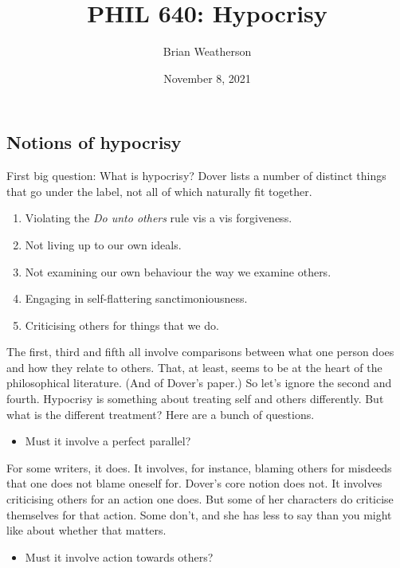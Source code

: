 \documentclass[
]{article}
\title{PHIL 640: Hypocrisy}
\author{Brian Weatherson}
\date{November 8, 2021}
\providecommand{\tightlist}{%
  \setlength{\itemsep}{0pt}\setlength{\parskip}{0pt}}
\begin{document}
\maketitle

\hypertarget{notions-of-hypocrisy}{%
\subsection{Notions of hypocrisy}\label{notions-of-hypocrisy}}

First big question: What is hypocrisy? Dover lists a number of distinct
things that go under the label, not all of which naturally fit together.

\begin{enumerate}
\def\labelenumi{\arabic{enumi}.}
\tightlist
\item
  Violating the \emph{Do unto others} rule vis a vis forgiveness.
\item
  Not living up to our own ideals.
\item
  Not examining our own behaviour the way we examine others.
\item
  Engaging in self-flattering sanctimoniousness.
\item
  Criticising others for things that we do.
\end{enumerate}

The first, third and fifth all involve comparisons between what one
person does and how they relate to others. That, at least, seems to be
at the heart of the philosophical literature. (And of Dover's paper.) So
let's ignore the second and fourth. Hypocrisy is something about
treating self and others differently. But what is the different
treatment? Here are a bunch of questions.

\begin{itemize}
\tightlist
\item
  Must it involve a perfect parallel?
\end{itemize}

For some writers, it does. It involves, for instance, blaming others for
misdeeds that one does not blame oneself for. Dover's core notion does
not. It involves criticising others for an action one does. But some of
her characters do criticise themselves for that action. Some don't, and
she has less to say than you might like about whether that matters.

\begin{itemize}
\tightlist
\item
  Must it involve action towards others?
\end{itemize}
\end{document}
